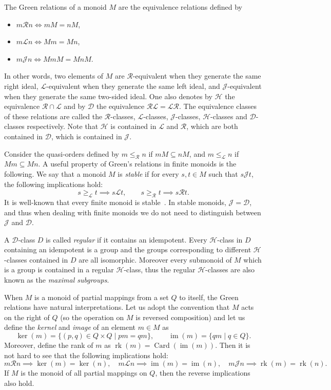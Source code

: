 \documentclass[a4paper,UKenglish,numberwithinsect,cleveref]{lipics-v2021}
\newcommand{\HH}{\mathrel{\mathscr{H}}}
\newcommand{\JJ}{\mathrel{\mathscr{J}}}
\newcommand{\DD}{\mathrel{\mathscr{D}}}
\newcommand{\RR}{\mathrel{\mathscr{R}}}
\newcommand{\LL}{\mathrel{\mathscr{L}}}
\newcommand*{\Card}{\operatorname{Card}}
\newcommand*{\Image}{\operatorname{im}}
\newcommand*{\rank}{\operatorname{rk}}
\begin{document}
The Green relations of a monoid $M$ are the equivalence relations defined by
\begin{itemize}
    \item $m\RR n \iff mM=nM$, 
    \item $m\LL n \iff Mm=Mn$,
    \item $m\JJ n \iff MmM=MnM$.
\end{itemize}
In other words, two elements of $M$ are $\RR$-equivalent when they generate the same right ideal, $\LL$-equivalent when they generate the same left ideal, and $\JJ$-equivalent when they generate the same two-sided ideal. One also denotes by $\HH$ the equivalence $\RR\cap \LL$ and by $\DD$ the equivalence $\RR\LL=\LL\RR$. The equivalence classes of these relations are called the $\RR$-classes, $\LL$-classes, $\JJ$-classes, $\HH$-classes and $\DD$-classes respectively. Note that $\HH$ is contained in $\LL$ and $\RR$, which are both contained in $\DD$, which is contained in $\JJ$. 

Consider the quasi-orders defined by $m\leq_{\RR}n$ if $mM\subseteq nM$, and $m\leq_{\LL}n$ if $Mm\subseteq Mn$. A useful property of Green's relations in finite monoids is the following. We say that a monoid $M$ is \emph{stable} if for every $s,t\in M$ such that $s\JJ t$, the following implications hold:
\begin{equation*}
    s\geq_{\LL} t\implies s\LL t,\qquad s\geq_{\RR} t \implies s\RR t.
\end{equation*}
It is well-known that every finite monoid is stable~\cite[Lemma 1.1, Chapter V]{book/Grillet1995}. In stable monoids, $\JJ=\DD$, and thus when dealing with finite monoids we do not need to distinguish between $\JJ$ and $\DD$.

A $\DD$-class $D$ is called \emph{regular} if it contains an idempotent. Every $\HH$-class in $D$ containing an idempotent is a group and the groups corresponding to different $\HH$-classes contained in $D$ are all isomorphic. Moreover every submonoid of $M$ which is a group is contained in a regular $\HH$-class, thus the regular $\HH$-classes are also known as the \emph{maximal subgroups}.

When $M$ is a monoid of partial mappings from a set $Q$ to itself, the Green relations have natural interpretations. Let us adopt the convention that $M$ acts on the right of $Q$ (so the operation on $M$ is reversed composition) and let us define the \emph{kernel} and \emph{image} of an element $m\in M$ as 
\begin{equation*}
    \ker(m) = \{ (p,q)\in Q\times Q \mid pm = qm\},\qquad \Image(m) = \{qm \mid q\in Q\}.
\end{equation*}
Moreover, define the rank of $m$ as $\rank(m) = \Card(\Image(m))$. Then it is not hard to see that the following implications hold:
\[
    m\RR n\implies \ker(m)=\ker(n),\quad m \LL n \implies \Image(m)=\Image(n),\quad m\JJ n \implies \rank(m) = \rank(n).
\]
If $M$ is the monoid of all partial mappings on $Q$, then the reverse implications also hold.
\end{document}
